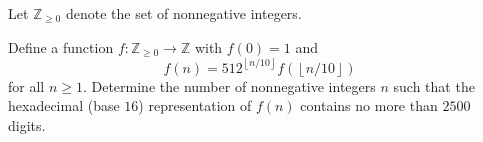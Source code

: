 Let $\mathbb{Z}_{\ge 0}$ denote the set of nonnegative integers.

Define a function $f:\mathbb{Z}_{\ge 0} \to\mathbb{Z}$ with $f\left(0\right)=1$ and \[ f\left(n\right)=512^{\left\lfloor n/10 \right\rfloor}f\left(\left\lfloor n/10 \right\rfloor\right)\]
for all $n \ge 1$. Determine the number of nonnegative integers $n$ such that the hexadecimal (base $16$) representation of $f\left(n\right)$ contains no more than $2500$ digits.
